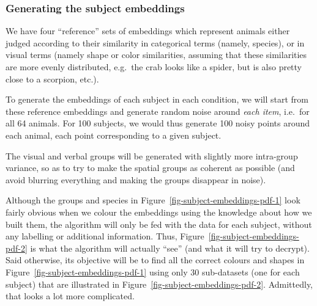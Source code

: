 \documentclass[
  authoryear]{elsarticle}
\begin{document}
\subsubsection{Generating the subject
embeddings}\label{generating-the-subject-embeddings}

We have four ``reference'' sets of embeddings which represent animals
either judged according to their similarity in categorical terms
(namely, species), or in visual terms (namely shape or color
similarities, assuming that these similarities are more evenly
distributed, e.g.~the crab looks like a spider, but is also pretty close
to a scorpion, etc.).

To generate the embeddings of each subject in each condition, we will
start from these reference embeddings and generate random noise around
\emph{each item}, i.e.~for all 64 animals. For 100 subjects, we would
thus generate 100 noisy points around each animal, each point
corresponding to a given subject.

The visual and verbal groups will be generated with slightly more
intra-group variance, so as to try to make the spatial groups as
coherent as possible (and avoid blurring everything and making the
groups disappear in noise).

Although the groups and species in
{Figure~\ref{fig-subject-embeddings-pdf-1}} look fairly obvious when we
colour the embeddings using the knowledge about how we built them, the
algorithm will only be fed with the data for each subject, without any
labelling or additional information. Thus,
{Figure~\ref{fig-subject-embeddings-pdf-2}} is what the algorithm will
actually ``see'' (and what it will try to decrypt). Said otherwise, its
objective will be to find all the correct colours and shapes in
{Figure~\ref{fig-subject-embeddings-pdf-1}} using only 30 sub-datasets
(one for each subject) that are illustrated in
{Figure~\ref{fig-subject-embeddings-pdf-2}}. Admittedly, that looks a
lot more complicated.
\end{document}
